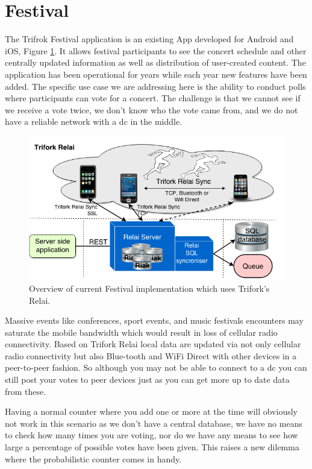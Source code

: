 \section{Festival}
The Trifrok Festival application is an existing App developed for Android and iOS, Figure \ref{fig:relai_layout}. It allows festival participants to see the concert schedule and other centrally updated information as well as distribution of user-created content. The application has been operational for years while each year new features have been added. The specific use case we are addressing here is the ability to conduct polls where participants can vote for a concert. The challenge is that we cannot see if we receive a vote twice, we don't know who the vote came from, and we do not have a reliable network with a \gls{dc} in the middle.
\begin{figure}[!ht]
	\centering
	\includegraphics[width=1\textwidth]{figures/TriforkRelai.png}
	
	\caption{Overview of current Festival implementation which uses Trifork's Relai.}
	\label{fig:relai_layout}
\end{figure}

Massive events like conferences, sport events, and music festivals encounters may saturate the mobile bandwidth which would result in loss of cellular radio connectivity. Based on Trifork Relai local data are updated via not only cellular radio connectivity but also Blue-tooth and WiFi Direct with other devices in a peer-to-peer fashion. So although you may not be able to connect to a \gls{dc} you can still post your votes to peer devices just as you can get more up to date data from these.

Having a normal counter where you add one or more at the time will obviously not work in this scenario as we don't have a central database, we have no means to check how many times you are voting, nor do we have any means to see how large a percentage of possible votes have been given. This raises a new dilemma where the probabilistic counter comes in handy.

